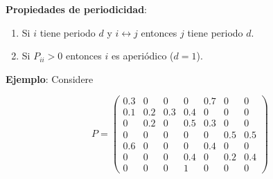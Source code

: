 \documentclass[12pt,a4paper]{article}
\begin{document}
\textbf{Propiedades de periodicidad}:

\begin{enumerate}
    \item Si $i$ tiene periodo $d$ y $i \leftrightarrow j$ entonces $j$ tiene periodo $d$.
    \item Si $P_{ii} > 0$ entonces $i$ es aperiódico ($d=1$).
\end{enumerate}

\textbf{Ejemplo}: Considere

\begin{equation*}
P = \begin{pmatrix}
0.3 & 0 & 0 & 0 & 0.7 & 0 & 0 \\
0.1 & 0.2 & 0.3 & 0.4 & 0 & 0 & 0 \\
0 & 0.2 & 0 & 0.5 & 0.3 & 0 & 0 \\
0 & 0 & 0 & 0 & 0 & 0.5 & 0.5 \\
0.6 & 0 & 0 & 0 & 0.4 & 0 & 0 \\
0 & 0 & 0 & 0.4 & 0 & 0.2 & 0.4 \\
0 & 0 & 0 & 1 & 0 & 0 & 0
\end{pmatrix}
\end{equation*}
\end{document}
